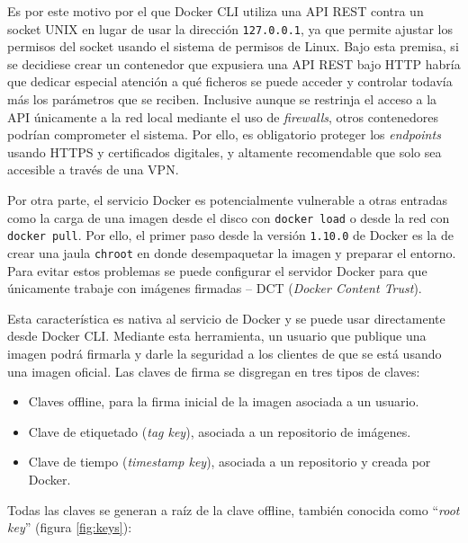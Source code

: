 Es por este motivo por el que Docker CLI utiliza una API REST contra un socket
UNIX en lugar de usar la dirección \texttt{127.0.0.1}, ya que permite ajustar
los permisos del socket usando el sistema de permisos de Linux. Bajo esta
premisa, si se decidiese crear un contenedor que expusiera una API REST bajo
HTTP habría que dedicar especial atención a qué ficheros se puede acceder y
controlar todavía más los parámetros que se reciben. Inclusive aunque se restrinja
el acceso a la API únicamente a la red local mediante el uso de \textit{firewalls},
otros contenedores podrían comprometer el sistema. Por ello, es obligatorio
proteger los \textit{endpoints} usando HTTPS y certificados digitales, y altamente
recomendable que solo sea accesible a través de una VPN.

Por otra parte, el servicio Docker es potencialmente vulnerable a otras entradas como
la carga de una imagen desde el disco con \lstinline[style=bash]!docker load!
o desde la red con \lstinline[style=bash]!docker pull!. Por ello, el primer paso
desde la versión \texttt{1.10.0} de Docker es la de crear una jaula \texttt{chroot}
en donde desempaquetar la imagen y preparar el entorno. Para evitar estos problemas
se puede configurar el servidor Docker para que únicamente trabaje con imágenes
firmadas -- DCT (\textit{Docker Content Trust}).

Esta característica es nativa al servicio de Docker y se puede usar
directamente desde Docker CLI. Mediante esta herramienta, un usuario que
publique una imagen podrá firmarla y darle la seguridad a los clientes
de que se está usando una imagen oficial. Las claves de firma se disgregan
en tres tipos de claves:

\begin{itemize}
  \item Claves offline, para la firma inicial de la imagen asociada a un usuario.
  \item Clave de etiquetado (\textit{tag key}), asociada a un repositorio de imágenes.
  \item Clave de tiempo (\textit{timestamp key}), asociada a un repositorio y creada
        por Docker.
\end{itemize}

Todas las claves se generan a raíz de la clave offline, también conocida como
``\textit{root key}'' (figura \ref{fig:keys}):

